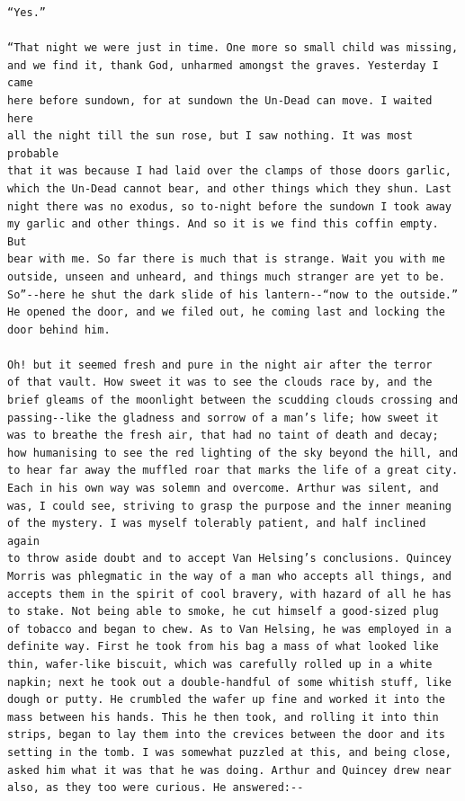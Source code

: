 \documentclass{article}
\begin{document}
\begin{verbatim}
“Yes.”

“That night we were just in time. One more so small child was missing,
and we find it, thank God, unharmed amongst the graves. Yesterday I came
here before sundown, for at sundown the Un-Dead can move. I waited here
all the night till the sun rose, but I saw nothing. It was most probable
that it was because I had laid over the clamps of those doors garlic,
which the Un-Dead cannot bear, and other things which they shun. Last
night there was no exodus, so to-night before the sundown I took away
my garlic and other things. And so it is we find this coffin empty. But
bear with me. So far there is much that is strange. Wait you with me
outside, unseen and unheard, and things much stranger are yet to be.
So”--here he shut the dark slide of his lantern--“now to the outside.”
He opened the door, and we filed out, he coming last and locking the
door behind him.

Oh! but it seemed fresh and pure in the night air after the terror
of that vault. How sweet it was to see the clouds race by, and the
brief gleams of the moonlight between the scudding clouds crossing and
passing--like the gladness and sorrow of a man’s life; how sweet it
was to breathe the fresh air, that had no taint of death and decay;
how humanising to see the red lighting of the sky beyond the hill, and
to hear far away the muffled roar that marks the life of a great city.
Each in his own way was solemn and overcome. Arthur was silent, and
was, I could see, striving to grasp the purpose and the inner meaning
of the mystery. I was myself tolerably patient, and half inclined again
to throw aside doubt and to accept Van Helsing’s conclusions. Quincey
Morris was phlegmatic in the way of a man who accepts all things, and
accepts them in the spirit of cool bravery, with hazard of all he has
to stake. Not being able to smoke, he cut himself a good-sized plug
of tobacco and began to chew. As to Van Helsing, he was employed in a
definite way. First he took from his bag a mass of what looked like
thin, wafer-like biscuit, which was carefully rolled up in a white
napkin; next he took out a double-handful of some whitish stuff, like
dough or putty. He crumbled the wafer up fine and worked it into the
mass between his hands. This he then took, and rolling it into thin
strips, began to lay them into the crevices between the door and its
setting in the tomb. I was somewhat puzzled at this, and being close,
asked him what it was that he was doing. Arthur and Quincey drew near
also, as they too were curious. He answered:--


\end{verbatim}
\end{document}
